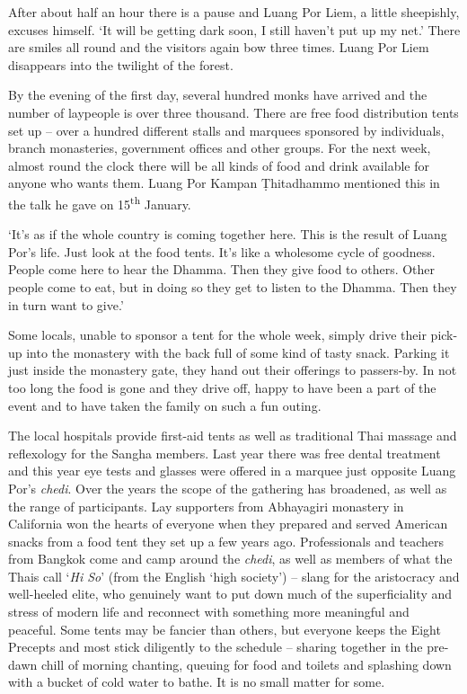 After about half an hour there is a pause and Luang Por Liem, a little
sheepishly, excuses himself. `It will be getting dark soon, I still
haven't put up my net.' There are smiles all round and the visitors
again bow three times. Luang Por Liem disappears into the twilight of
the forest. 

By the evening of the first day, several hundred monks have arrived and
the number of laypeople is over three thousand. There are free food
distribution tents set up -- over a hundred different stalls and
marquees sponsored by individuals, branch monasteries, government
offices and other groups. For the next week, almost round the clock
there will be all kinds of food and drink available for anyone who wants
them. Luang Por Kampan Ṭhitadhammo mentioned this in the talk he gave on
15\textsuperscript{th} January. 

`It's as if the whole country is coming together here. This is the
result of Luang Por's life. Just look at the food tents. It's like a
wholesome cycle of goodness. People come here to hear the Dhamma. Then
they give food to others. Other people come to eat, but in doing so they
get to listen to the Dhamma. Then they in turn want to give.'

Some locals, unable to sponsor a tent for the whole week, simply drive
their pick-up into the monastery with the back full of some kind of
tasty snack. Parking it just inside the monastery gate, they hand out
their offerings to passers-by. In not too long the food is gone and they
drive off, happy to have been a part of the event and to have taken the
family on such a fun outing. 

The local hospitals provide first-aid tents as well as traditional Thai
massage and reflexology for the Sangha members. Last year there was free
dental treatment and this year eye tests and glasses were offered in a
marquee just opposite Luang Por's \emph{chedi}. Over the years the scope
of the gathering has broadened, as well as the range of participants. 
Lay supporters from Abhayagiri monastery in California won the hearts of
everyone when they prepared and served American snacks from a food tent
they set up a few years ago. Professionals and teachers from Bangkok
come and camp around the \emph{chedi}, as well as members of what the
Thais call `\emph{Hi So}' (from the English `high society') -- slang for
the aristocracy and well-heeled elite, who genuinely want to put down
much of the superficiality and stress of modern life and reconnect with
something more meaningful and peaceful. Some tents may be fancier than
others, but everyone keeps the Eight Precepts and most stick diligently
to the schedule -- sharing together in the pre-dawn chill of morning
chanting, queuing for food and toilets and splashing down with a bucket
of cold water to bathe. It is no small matter for some. 


